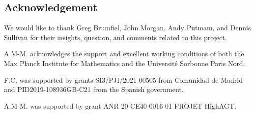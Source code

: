 
\subsection*{Acknowledgement}

We would like to thank Greg Brumfiel, John Morgan, Andy Putmam, and Dennis Sullivan for their insights, question, and comments related to this project.

A.M-M. acknowledges the support and excellent working conditions of both the Max Planck Institute for Mathematics and the Universit\'e Sorbonne Paris Nord.

F.C. was supported by grants SI3/PJI/2021-00505 from Comunidad de Madrid and PID2019-108936GB-C21 from the Spanish government.

A.M-M. was supported by grant ANR 20 CE40 0016 01 PROJET HighAGT.